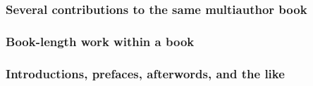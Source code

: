 \documentclass[11pt,letterpaper,oneside]{article}
\begin{document}
\begin{citebib}
\item \cite[325]{miller2014}
\item \cite{ellet1968}
\end{citebib}

\subsubsection{Several contributions to the same multiauthor book}



\begin{citebib}
\item \cite[84--87]{keating1968}
\item \cite[362--70]{lippincott1968}
\item \cite[107--19]{draper1987}
\item \cite[189--207]{harrington1987}
\nocite{angle1968,zukowsky1987}
\end{citebib}

\subsubsection{Book-length work within a book}

\begin{citebib}
\item \cite{bernard1990a}
\item \cite{updike1995a}
\end{citebib}

\subsubsection{Introductions, prefaces, afterwords, and the like}

\end{document}
